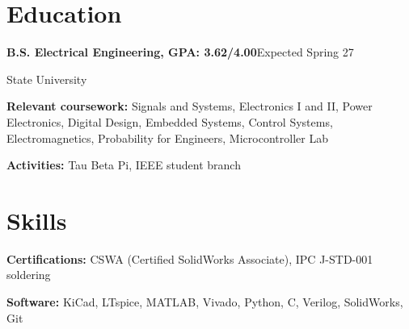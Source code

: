 \documentclass[letterpaper,11pt]{article}
\newcommand{\entry}[2]{\textbf{#1}\hfill #2\par}
\begin{document}
\section{Education}

\entry{B.S. Electrical Engineering, GPA: 3.62/4.00}{Expected Spring 27}
State University\par
\textbf{Relevant coursework:} Signals and Systems, Electronics I and II, Power Electronics, Digital Design, Embedded Systems, Control Systems, Electromagnetics, Probability for Engineers, Microcontroller Lab\par
\textbf{Activities:} Tau Beta Pi, IEEE student branch\par

\section{Skills}

\textbf{Certifications:} CSWA (Certified SolidWorks Associate), IPC J-STD-001 soldering\par
\textbf{Software:} KiCad, LTspice, MATLAB, Vivado, Python, C, Verilog, SolidWorks, Git\par
\end{document}
